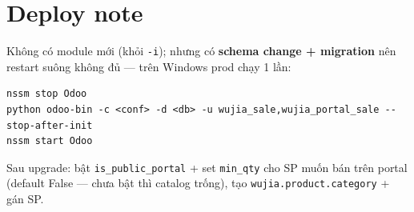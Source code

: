 \section{Deploy note}

Không có module mới (khỏi \texttt{-i}); nhưng có \textbf{schema change + migration} nên restart
suông không đủ --- trên Windows prod chạy 1 lần:
\begin{verbatim}
nssm stop Odoo
python odoo-bin -c <conf> -d <db> -u wujia_sale,wujia_portal_sale --stop-after-init
nssm start Odoo
\end{verbatim}
Sau upgrade: bật \texttt{is\_public\_portal} + set \texttt{min\_qty} cho SP muốn bán trên portal
(default False --- chưa bật thì catalog trống), tạo \texttt{wujia.product.category} + gán SP.
